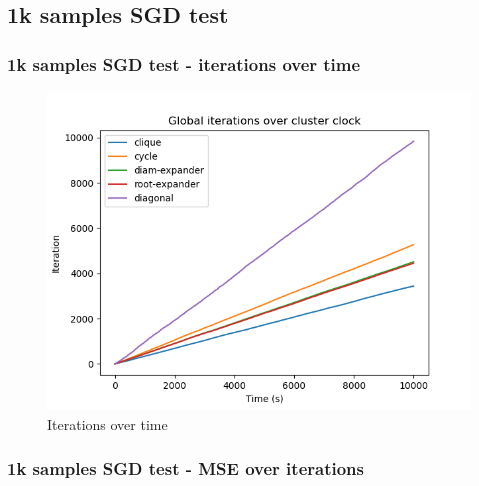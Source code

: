 \documentclass[11pt]{article}
\makeatletter
\def\maxwidth{\ifdim\Gin@nat@width>\linewidth\linewidth
    \else\Gin@nat@width\fi}
\let\Oldincludegraphics\includegraphics
\renewcommand{\includegraphics}[1]{\Oldincludegraphics[width=.8\maxwidth]{#1}}
\makeatother
\begin{document}
    \subsection{1k samples SGD test}\label{k-samples-sgd-test}

\subsubsection{1k samples SGD test - iterations over
time}\label{k-samples-sgd-test---iterations-over-time}

\begin{figure}
\centering
\includegraphics{media/img/tests/test_003_1ksamples_stochastic/1_iter_time.png}
\caption{Iterations over time}
\end{figure}

\subsubsection{1k samples SGD test - MSE over
iterations}\label{k-samples-sgd-test---mse-over-iterations}
\end{document}
